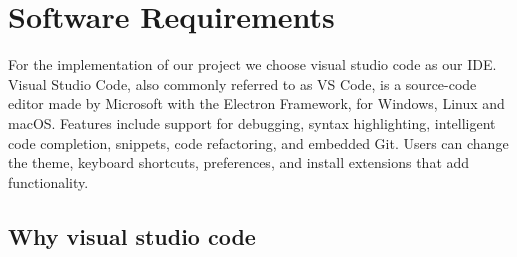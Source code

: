 \documentclass[12 pt, oneside]{book}
\begin{document}

\section{Software Requirements}

For the implementation of our project we choose visual studio code as our IDE. Visual Studio Code, also commonly referred to as VS Code, is a source-code editor made by Microsoft with the Electron Framework, for Windows, Linux and macOS. Features include support for debugging, syntax highlighting, intelligent code completion, snippets, code refactoring, and embedded Git. Users can change the theme, keyboard shortcuts, preferences, and install extensions that add functionality.

\subsection{Why visual studio code}
\end{document}

